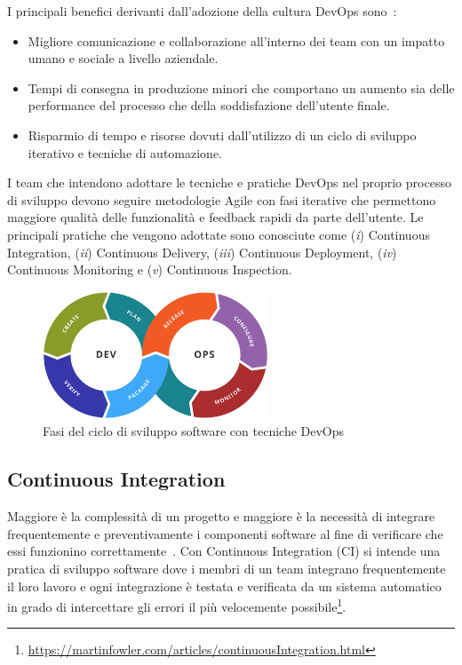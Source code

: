 I principali benefici derivanti dall'adozione della cultura DevOps sono~\cite{krief2019learning}:

\begin{itemize}
    \item Migliore comunicazione e collaborazione all'interno dei team con un impatto umano e sociale a livello aziendale.
    
    \item Tempi di consegna in produzione minori che comportano un aumento sia delle performance del processo che della soddisfazione dell'utente finale.
    
    \item Risparmio di tempo e risorse dovuti dall'utilizzo di un ciclo di sviluppo iterativo e tecniche di automazione.
\end{itemize}

I team che intendono adottare le tecniche e pratiche DevOps nel proprio processo di sviluppo devono seguire metodologie Agile con fasi iterative che permettono maggiore qualità delle funzionalità e feedback rapidi da parte dell'utente. 
Le principali pratiche che vengono adottate sono conosciute come (\textit{i}) Continuous Integration, (\textit{ii}) Continuous Delivery, (\textit{iii}) Continuous Deployment, (\textit{iv}) Continuous Monitoring e (\textit{v}) Continuous Inspection.

\begin{figure}[H]
    \centering
    \includegraphics[width=0.6\textwidth]{img/Devops-toolchain.png}
    \caption{Fasi del ciclo di sviluppo software con tecniche DevOps}
\end{figure}

\subsection{Continuous Integration}
\label{ci-sec}
Maggiore è la complessità di un progetto e maggiore è la necessità di integrare frequentemente e preventivamente i componenti software al fine di verificare che essi funzionino correttamente~\cite{duvall2007continuous}.
Con Continuous Integration (CI) si intende una pratica di sviluppo software dove i membri di un team integrano frequentemente il loro lavoro e ogni integrazione è testata e verificata da un sistema automatico in grado di intercettare gli errori il più velocemente possibile\footnote{\href{https://martinfowler.com/articles/continuousIntegration.html}{https://martinfowler.com/articles/continuousIntegration.html}}.

